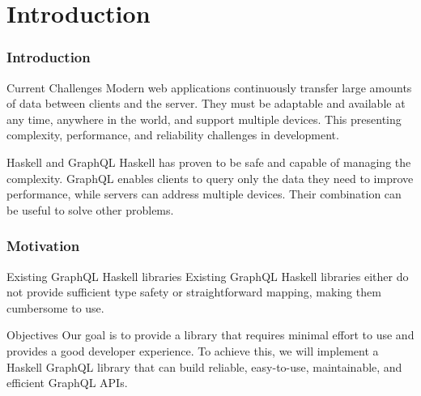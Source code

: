 \section{Introduction}

\begin{frame}\frametitle{Introduction}

    \begin{block}{Current Challenges}
        Modern web applications continuously transfer large amounts of data between clients and the server. They must be adaptable and available at any time, anywhere in the world, and support multiple devices. This presenting complexity, performance, and reliability challenges in development. 
    \end{block}

    \begin{block}{Haskell and  GraphQL}
        Haskell has proven to be safe and capable of managing the complexity. GraphQL enables clients to query only the data they need to improve performance, while servers can address multiple devices. Their combination can be useful to solve other problems.
    \end{block}

\end{frame}

\begin{frame}\frametitle{Motivation}

\begin{block}{Existing GraphQL Haskell libraries}
    Existing GraphQL Haskell libraries either do not provide sufficient type safety or straightforward mapping, making them cumbersome to use.
\end{block}


\begin{block}{Objectives}
Our goal is to provide a library that requires minimal effort to use and provides a good developer experience. To achieve this, we will implement a Haskell GraphQL library that can build reliable, easy-to-use, maintainable, and efficient GraphQL APIs.
\end{block}

\end{frame}